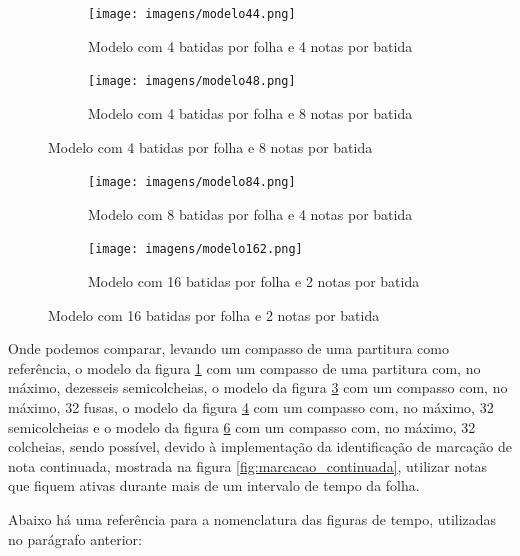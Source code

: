 \documentclass[12pt]{report}
\begin{document}
{\begin{figure}[H]
  \centering
  \begin{subfigure}{0.4\textwidth}
    \centering
    \texttt{[image: imagens/modelo44.png]}
    \caption{Modelo com 4 batidas por folha e 4 notas por batida}
    \label{fig:modelo44}
  \end{subfigure}
  \begin{subfigure}{0.4\textwidth}
    \centering
    \texttt{[image: imagens/modelo48.png]}
    \caption{Modelo com 4 batidas por folha e 8 notas por batida}
    \label{fig:modelo48}
  \end{subfigure}
\end{figure}

\begin{figure}[H]
  \centering
  \begin{subfigure}{0.4\textwidth}
    \centering
    \texttt{[image: imagens/modelo84.png]}
    \caption{Modelo com 8 batidas por folha e 4 notas por batida}
    \label{fig:modelo84}
  \end{subfigure}
  \begin{subfigure}{0.4\textwidth}
    \centering
    \texttt{[image: imagens/modelo162.png]}
    \caption{Modelo com 16 batidas por folha e 2 notas por batida}
    \label{fig:modelo162}
  \end{subfigure}
\end{figure}

Onde podemos comparar, levando um compasso de uma partitura como referência, o modelo da figura \ref{fig:modelo44} com um compasso de uma partitura com, no máximo, dezesseis semicolcheias, o modelo da figura \ref{fig:modelo48} com um compasso com, no máximo, 32 fusas, o modelo da figura \ref{fig:modelo84} com um compasso com, no máximo, 32 semicolcheias e o modelo da figura \ref{fig:modelo162} com um compasso com, no máximo, 32 colcheias, sendo possível, devido à implementação da identificação de marcação de nota continuada, mostrada na figura \ref{fig:marcacao_continuada}, utilizar notas que fiquem ativas durante mais de um intervalo de tempo da folha.

Abaixo há uma referência para a nomenclatura das figuras de tempo, utilizadas no parágrafo anterior:

}
\end{document}
